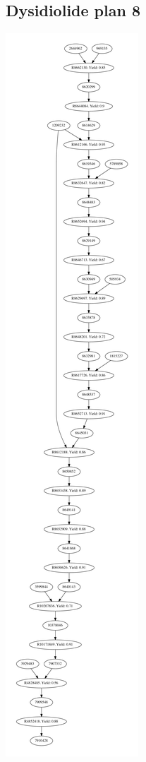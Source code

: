 \documentclass[a4paper,10pt,titlepage]{paper}
\begin{document}
\subsection{Dysidiolide plan 8}
\centering
\includegraphics[scale=0.2]{Synteseplaner/Dysidiolide/plan8.pdf}
\label{Appendix::Dysidiolide8}
\end{document}
